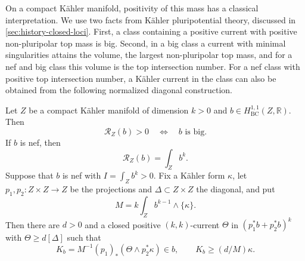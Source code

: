 On a compact K\"ahler manifold, positivity of this mass has a classical interpretation. We use two facts from K\"ahler pluripotential theory, discussed in \cref{sec:history-closed-loci}. First, a class containing a positive current with positive non-pluripolar top mass is big. Second, in a big class a current with minimal singularities attains the volume, the largest non-pluripolar top mass, and for a nef and big class this volume is the top intersection number. For a nef class with positive top intersection number, a K\"ahler current in the class can also be obtained from the following normalized diagonal construction.

\begin{proposition}\label{prop:restricted-mass-bigness}
Let $Z$ be a compact K\"ahler manifold of dimension $k>0$ and $b\in H^{1,1}_{\mathrm{BC}}(Z,\mathbb R)$. Then
\[
 \mathcal R_Z(b)>0\quad\Longleftrightarrow\quad b\text{ is big}.
\]
If $b$ is nef, then
\begin{equation}\label{eq:nef-restricted-mass}
 \mathcal R_Z(b)=\int_Zb^k.
\end{equation}
Suppose that $b$ is nef with $I=\int_Zb^k>0$. Fix a K\"ahler form $\kappa$, let $p_1,p_2\colon Z\times Z\to Z$ be the projections and $\Delta\subset Z\times Z$ the diagonal, and put
\[
 M=k\int_Zb^{k-1}\wedge\{\kappa\}.
\]
Then there are $d>0$ and a closed positive $(k,k)$-current $\Theta$ in $(p_1^*b+p_2^*b)^k$ with $\Theta\geq d[\Delta]$ such that
\begin{equation}\label{eq:normalized-diagonal-current}
 K_b=M^{-1}(p_1)_*(\Theta\wedge p_2^*\kappa)\in b,
 \qquad K_b\geq(d/M)\kappa.
\end{equation}
\end{proposition}
